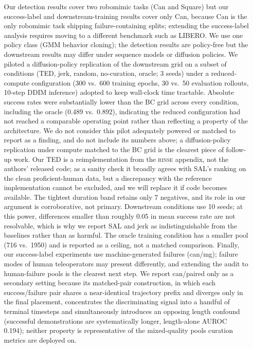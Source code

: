 \documentclass[10pt]{article}
\newcommand{\rinse}{\textsc{rinse}}
\begin{document}
Our detection results cover two robomimic tasks (Can and Square) but our
success-label and downstream-training results cover only Can, because Can is
the only robomimic task shipping failure-containing splits; extending the
success-label analysis requires moving to a different benchmark such as
LIBERO. We use one policy class (GMM behavior cloning); the detection
results are policy-free but the downstream results may differ under sequence
models or diffusion policies. We piloted a diffusion-policy replication of
the downstream grid on a subset of conditions (TED, jerk, random,
no-curation, oracle; 3 seeds) under a reduced-compute configuration (300
vs.\ 600 training epochs, 30 vs.\ 50 evaluation rollouts, 10-step DDIM
inference) adopted to keep wall-clock time tractable. Absolute success
rates were substantially lower than the BC grid across every condition,
including the oracle (0.489 vs.\ 0.892), indicating the reduced
configuration had not reached a comparable operating point rather than
reflecting a property of the architecture. We do not consider this pilot
adequately powered or matched to report as a finding, and do not include
its numbers above; a diffusion-policy replication under compute matched to
the BC grid is the clearest piece of follow-up work.
Our TED is a reimplementation from the \rinse{} appendix, not the authors'
released code; as a sanity check it broadly agrees with SAL's ranking on the
clean proficient-human data, but a discrepancy with the reference
implementation cannot be excluded, and we will replace it if code becomes
available. The tightest duration band retains only 7 negatives, and its
role in our argument is corroborative, not primary. Downstream conditions
use 10 seeds; at this power, differences smaller than roughly 0.05 in mean
success rate are not resolvable, which is why we report SAL and jerk as
indistinguishable from the baselines rather than as harmful. The oracle training
condition has a smaller pool (716 vs.\ 1950) and is reported as a ceiling,
not a matched comparison. Finally, our success-label experiments use
machine-generated failures (can/mg); failure modes of human teleoperators
may present differently, and extending the audit to human-failure pools is
the clearest next step. We report can/paired only as a secondary setting
because its matched-pair construction, in which each success/failure pair
shares a near-identical trajectory prefix and diverges only in the final
placement, concentrates the discriminating signal into a handful of
terminal timesteps and simultaneously introduces an opposing length
confound (successful demonstrations are systematically longer, length-alone
AUROC 0.194); neither property is representative of the mixed-quality pools
curation metrics are deployed on.
\end{document}
